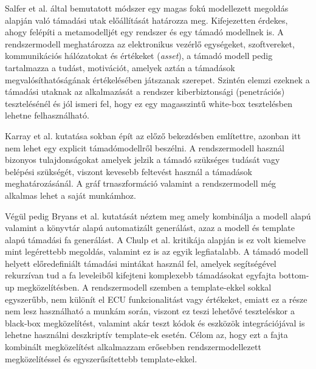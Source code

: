 Salfer et al.\cite{Salfer} által bemutatott módszer egy magas fokú modellezett megoldás alapján való támadási utak előállítását határozza meg. Kifejezetten érdekes, ahogy felépíti a metamodelljét egy rendszer és egy támadó modellnek is. A rendszermodell meghatározza az elektronikus vezérlő egységeket, szoftvereket, kommunikációs hálózatokat és értékeket (\textit{asset}), a támadó modell pedig tartalmazza a tudást, motivációt, amelyek aztán a támadások megvalósíthatóságának értékelésében játszanak szerepet. Szintén elemzi ezeknek a támadási utaknak az alkalmazását a rendszer kiberbiztonsági (penetrációs) tesztelésénél és jól ismeri fel, hogy ez egy magasszintű white-box tesztelésben lehetne felhasználható. 

Karray et al.\cite{Karray} kutatása sokban épít az előző bekezdésben említettre, azonban itt nem lehet egy explicit támadómodellről beszélni. A rendszermodell használ bizonyos tulajdonságokat amelyek jelzik a támadó szükséges tudását vagy belépési szükségét, viszont kevesebb feltevést használ a támadások meghatározásánál. A gráf trnaszformáció valamint a rendszermodell még alkalmas lehet a saját munkámhoz.

Végül pedig Bryans et al.\cite{Bryans} kutatását néztem meg amely kombinálja a modell alapú valamint a könyvtár alapú automatizált generálást, azaz a modell és template alapú támadási fa generálást. A Chulp et al.\cite{Chulp} kritikája alapján is ez volt kiemelve mint legérettebb megoldás, valamint ez is az egyik legfiatalabb. A támadó modell helyett előredefiniált támadási mintákat használ fel, amelyek segítségével rekurzívan tud a fa leveleiből kifejteni komplexebb támadásokat egyfajta bottom-up megközelítésben. A rendszermodell szemben a template-ekkel sokkal egyszerűbb, nem különít el ECU funkcionalitást vagy értékeket, emiatt ez a része nem lesz használható a munkám során, viszont ez teszi lehetővé teszteléskor a black-box megközelítést, valamint akár teszt kódok és eszközök integrációjával is lehetne használni deszkriptív template-ek esetén. Célom az, hogy ezt a fajta kombinált megközelítést alkalmazzam erősebben rendszermodellezett megközelítéssel és egyszerűsítettebb template-ekkel.

